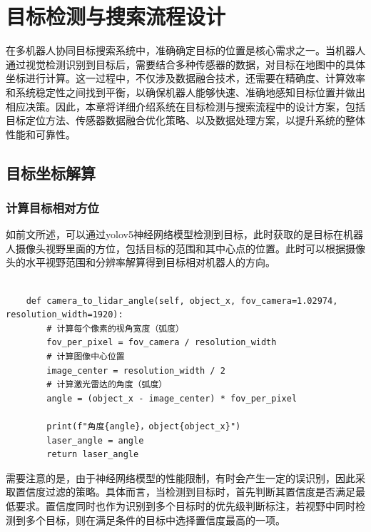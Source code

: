 \chapter{目标检测与搜索流程设计}
在多机器人协同目标搜索系统中，准确确定目标的位置是核心需求之一。当机器人通过视觉检测识别到目标后，需要结合多种传感器的数据，对目标在地图中的具体坐标进行计算。这一过程中，不仅涉及数据融合技术，还需要在精确度、计算效率和系统稳定性之间找到平衡，以确保机器人能够快速、准确地感知目标位置并做出相应决策。因此，本章将详细介绍系统在目标检测与搜索流程中的设计方案，包括目标定位方法、传感器数据融合优化策略、以及数据处理方案，以提升系统的整体性能和可靠性。
\section{目标坐标解算}
\subsection{计算目标相对方位}
如前文所述，可以通过yolov5神经网络模型检测到目标，此时获取的是目标在机器人摄像头视野里面的方位，包括目标的范围和其中心点的位置。此时可以根据摄像头的水平视野范围和分辨率解算得到目标相对机器人的方向。
\begin{lstlisting}[caption={根据摄像头位置计算目标相对方向}]
    
    def camera_to_lidar_angle(self, object_x, fov_camera=1.02974, resolution_width=1920):
        # 计算每个像素的视角宽度（弧度）
        fov_per_pixel = fov_camera / resolution_width
        # 计算图像中心位置
        image_center = resolution_width / 2
        # 计算激光雷达的角度（弧度）
        angle = (object_x - image_center) * fov_per_pixel

        print(f"角度{angle}，object{object_x}")
        laser_angle = angle
        return laser_angle

\end{lstlisting}
需要注意的是，由于神经网络模型的性能限制，有时会产生一定的误识别，因此采取置信度过滤的策略。具体而言，当检测到目标时，首先判断其置信度是否满足最低要求。置信度同时也作为识别到多个目标时的优先级判断标注，若视野中同时检测到多个目标，则在满足条件的目标中选择置信度最高的一项。

